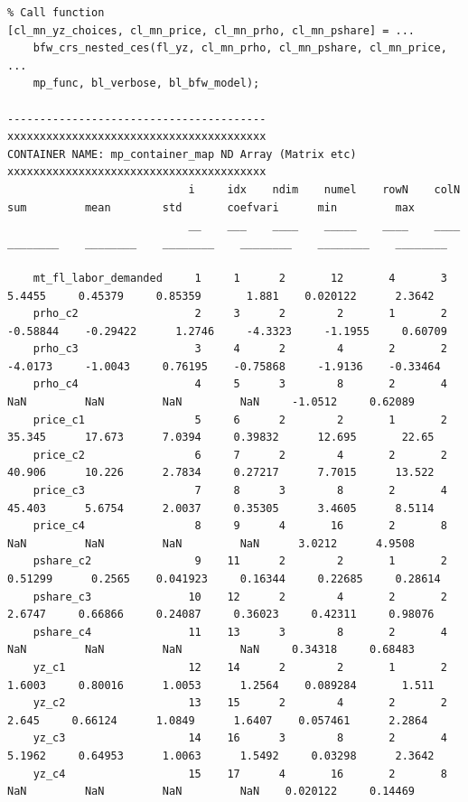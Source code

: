 \documentclass[
]{book}
\begin{document}
\begin{verbatim}
% Call function
[cl_mn_yz_choices, cl_mn_price, cl_mn_prho, cl_mn_pshare] = ...
    bfw_crs_nested_ces(fl_yz, cl_mn_prho, cl_mn_pshare, cl_mn_price, ...
    mp_func, bl_verbose, bl_bfw_model);

----------------------------------------
xxxxxxxxxxxxxxxxxxxxxxxxxxxxxxxxxxxxxxxx
CONTAINER NAME: mp_container_map ND Array (Matrix etc)
xxxxxxxxxxxxxxxxxxxxxxxxxxxxxxxxxxxxxxxx
                            i     idx    ndim    numel    rowN    colN      sum         mean        std       coefvari      min         max   
                            __    ___    ____    _____    ____    ____    ________    ________    ________    ________    ________    ________

    mt_fl_labor_demanded     1     1      2       12       4       3        5.4455     0.45379     0.85359       1.881    0.020122      2.3642
    prho_c2                  2     3      2        2       1       2      -0.58844    -0.29422      1.2746     -4.3323     -1.1955     0.60709
    prho_c3                  3     4      2        4       2       2       -4.0173     -1.0043     0.76195    -0.75868     -1.9136    -0.33464
    prho_c4                  4     5      3        8       2       4           NaN         NaN         NaN         NaN     -1.0512     0.62089
    price_c1                 5     6      2        2       1       2        35.345      17.673      7.0394     0.39832      12.695       22.65
    price_c2                 6     7      2        4       2       2        40.906      10.226      2.7834     0.27217      7.7015      13.522
    price_c3                 7     8      3        8       2       4        45.403      5.6754      2.0037     0.35305      3.4605      8.5114
    price_c4                 8     9      4       16       2       8           NaN         NaN         NaN         NaN      3.0212      4.9508
    pshare_c2                9    11      2        2       1       2       0.51299      0.2565    0.041923     0.16344     0.22685     0.28614
    pshare_c3               10    12      2        4       2       2        2.6747     0.66866     0.24087     0.36023     0.42311     0.98076
    pshare_c4               11    13      3        8       2       4           NaN         NaN         NaN         NaN     0.34318     0.68483
    yz_c1                   12    14      2        2       1       2        1.6003     0.80016      1.0053      1.2564    0.089284       1.511
    yz_c2                   13    15      2        4       2       2         2.645     0.66124      1.0849      1.6407    0.057461      2.2864
    yz_c3                   14    16      3        8       2       4        5.1962     0.64953      1.0063      1.5492     0.03298      2.3642
    yz_c4                   15    17      4       16       2       8           NaN         NaN         NaN         NaN    0.020122     0.14469


\end{verbatim}
\end{document}
